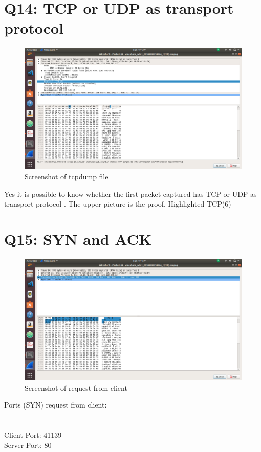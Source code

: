 \documentclass{article}
\begin{document}
\section{Q14: TCP or UDP as transport protocol}
 \begin{figure}[H]
 \centering
 \includegraphics[width=1.0\textwidth]{../q14/a.png}
 \caption{\label{fig:PING}Screenshot of tcpdump file}
 \end{figure}
Yes it is possible to know whether the first packet captured has TCP or UDP as transport protocol . The upper picture is the proof. Highlighted TCP(6)\\
 
\section{Q15: SYN and ACK}
 \begin{figure}[H]
 \centering
 \includegraphics[width=1.0\textwidth]{../q15/a.png}
 \caption{\label{fig:PING}Screenshot of request from client}
 \end{figure}
 
 Ports (SYN) request from client:\\ \\
 \\
 Client Port: 41139 \\
 Server Port: 80 \\
 
\end{document}
